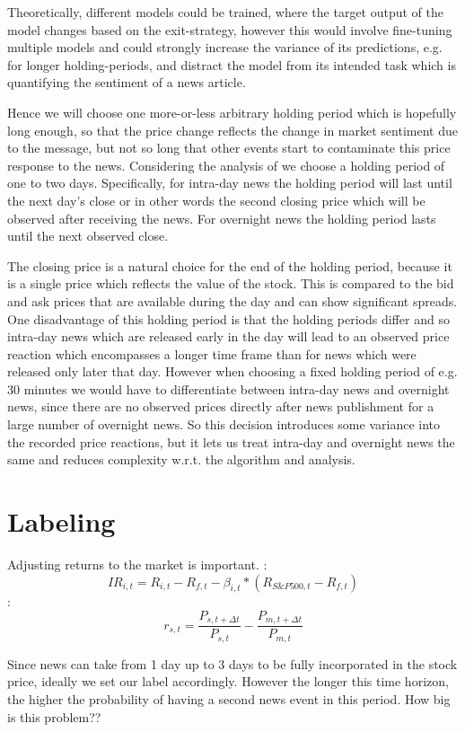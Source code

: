 \documentclass[12pt,a4paper]{article}
\begin{document}
	Theoretically, different models could be trained, where the target output of the model changes based on the exit-strategy, 
	however this would involve fine-tuning multiple models and could strongly increase the variance of its predictions, e.g. for longer holding-periods, 
	and distract the model from its intended task which is quantifying the sentiment of a news article.
	
	Hence we will choose one more-or-less arbitrary holding period which is hopefully long enough, so that the price change
	reflects the change in market sentiment due to the message, but not so long that other events start to contaminate this price response to the news.
	Considering the analysis of \cite{ke_predicting_2020} we choose a holding period of one to two days.
	Specifically, for intra-day news the holding period will last until the next day's close or in other words
	the second closing price which will be observed after receiving the news.
	For overnight news the holding period lasts until the next observed close.
	
	The closing price is a natural choice for the end of the holding period, because it is a single price which reflects the value of the stock. 
	This is compared to the bid and ask prices that are available during the day and can show significant spreads.
	One disadvantage of this holding period is that the holding periods differ and so intra-day news which are released
	early in the day will lead to an observed price reaction which encompasses a longer time frame than for news which were released only later that day.
	However when choosing a fixed holding period of e.g. 30 minutes we would have to differentiate between intra-day news and overnight news, since there are no observed prices directly after news publishment for a large number of overnight news.
	So this decision introduces some variance into the recorded price reactions, but it lets us treat intra-day and overnight news the same and reduces complexity w.r.t. the algorithm and analysis.
	
	\section{Labeling}
	Adjusting returns to the market is important.
	\cite{salbrechter_financial_2021-1}:
	$$
	I R_{i, t}=R_{i, t}-R_{f, t}-\beta_{i, t} *\left(R_{S \& P 500, t}-R_{f, t}\right)
	$$
	\cite{chen_stock_2021}:
	$$
	r_{s, t}=\frac{P_{s, t+\Delta t}}{P_{s, t}}-\frac{P_{m, t+\Delta t}}{P_{m, t}}
	$$
	
	
	Since news can take from 1 day up to 3 days to be fully incorporated in the stock price, ideally we set our label accordingly.
	However the longer this time horizon, the higher the probability of having a second news event in this period.
	How big is this problem??
	
	
	
	
	
\end{document}
